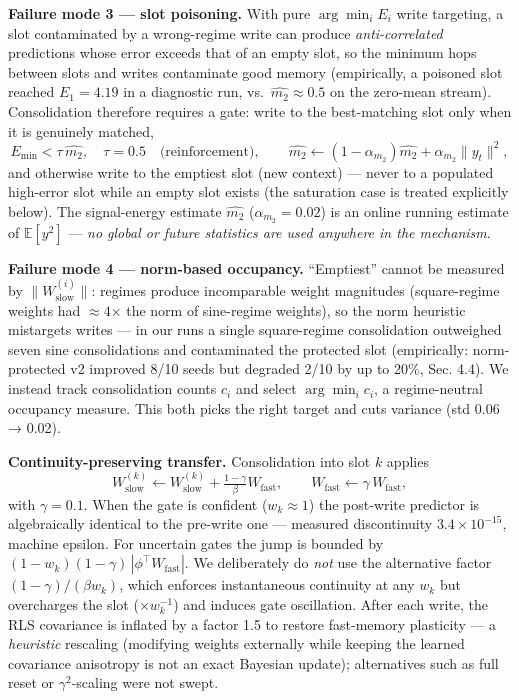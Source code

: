 \documentclass[11pt]{article}
\begin{document}
\textbf{Failure mode 3 --- slot poisoning.} With pure \(\arg\min_i E_i\) write
targeting, a slot contaminated by a wrong-regime write can produce
\emph{anti-correlated} predictions whose error exceeds that of an empty slot,
so the minimum hops between slots and writes contaminate good memory
(empirically, a poisoned slot reached \(E_1 = 4.19\) in a diagnostic
run, vs.~\(\widehat{m_2}\approx 0.5\) on the zero-mean stream).
Consolidation therefore requires a gate: write to the
best-matching slot only when it is genuinely matched,
\[
E_{\min} < \tau\,\widehat{m_2},\quad \tau = 0.5
\quad\text{(reinforcement)},
\qquad
\widehat{m_2}\!\leftarrow(1-\alpha_{m_2})\widehat{m_2} + \alpha_{m_2}\|y_t\|^2,
\]
and otherwise write to the emptiest slot (new context) --- never to a
populated high-error slot while an empty slot exists (the saturation
case is treated explicitly below). The signal-energy estimate \(\widehat{m_2}\)
(\(\alpha_{m_2}=0.02\)) is an online running estimate of
\(\mathbb{E}[y^{2}]\) --- \emph{no global or future statistics are used
anywhere in the mechanism}.

\textbf{Failure mode 4 --- norm-based occupancy.} ``Emptiest'' cannot be measured
by \(\|W_{\mathrm{slow}}^{(i)}\|\): regimes produce incomparable weight
magnitudes (square-regime weights had \(\approx 4\)× the norm of sine-regime
weights), so the norm heuristic mistargets writes --- in our runs a
single square-regime consolidation outweighed seven sine consolidations
and contaminated the protected slot (empirically: norm-protected v2
improved 8/10 seeds but degraded 2/10 by up to 20\%, Sec. 4.4). We
instead track
consolidation counts \(c_i\) and select
\(\arg\min_i c_i\), a regime-neutral occupancy measure. This both picks the
right target and cuts variance (std 0.06 → 0.02).

\textbf{Continuity-preserving transfer.} Consolidation into slot \(k\) applies
\[
W_{\mathrm{slow}}^{(k)} \leftarrow W_{\mathrm{slow}}^{(k)} + \tfrac{1-\gamma}{\beta}W_{\mathrm{fast}},
\qquad
W_{\mathrm{fast}} \leftarrow \gamma\,W_{\mathrm{fast}},
\]
with \(\gamma=0.1\). When the gate is confident (\(w_k\approx1\)) the
post-write predictor is algebraically identical to the pre-write one ---
measured discontinuity \(3.4\times10^{-15}\), machine epsilon. For
uncertain gates the jump is bounded by
\((1-w_k)(1-\gamma)\,|\phi^\top W_{\mathrm{fast}}|\). We deliberately do
\emph{not} use the alternative factor \((1-\gamma)/(\beta w_k)\), which enforces
instantaneous continuity at any \(w_k\) but overcharges the slot
(\(\times w_k^{-1}\)) and induces gate oscillation. After each write, the
RLS covariance is inflated by a factor 1.5 to restore fast-memory
plasticity --- a \emph{heuristic} rescaling (modifying weights externally
while keeping the learned covariance anisotropy is not an exact
Bayesian update); alternatives such as full reset or
\(\gamma^{2}\)-scaling were not swept.
\end{document}
